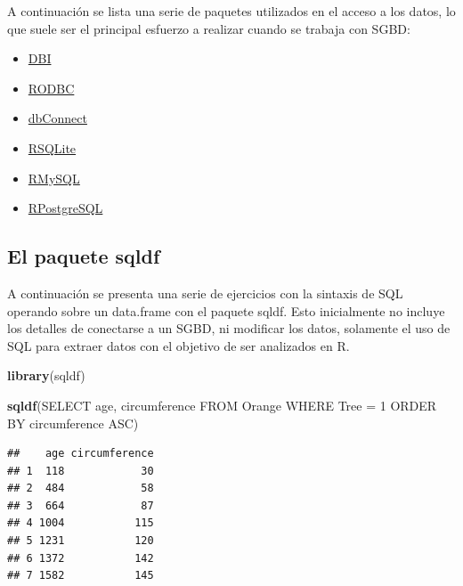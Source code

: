\documentclass[
]{book}
\newenvironment{Shaded}{\begin{snugshade}}{\end{snugshade}}
\newcommand{\FunctionTok}[1]{\textcolor[rgb]{0.13,0.29,0.53}{\textbf{#1}}}
\newcommand{\NormalTok}[1]{#1}
\newcommand{\StringTok}[1]{\textcolor[rgb]{0.31,0.60,0.02}{#1}}
\providecommand{\tightlist}{%
  \setlength{\itemsep}{0pt}\setlength{\parskip}{0pt}}
\theoremstyle{break}
\theoremstyle{nonumberplain}
\begin{document}
A continuación se lista una serie de paquetes utilizados en el acceso a los datos, lo que suele ser el principal esfuerzo a realizar cuando se trabaja con SGBD:

\begin{itemize}
\tightlist
\item
  \href{https://cran.r-project.org/web/packages/DBI/index.html}{DBI}
\item
  \href{https://cran.r-project.org/web/packages/RODBC/index.html}{RODBC}
\item
  \href{https://cran.r-project.org/web/packages/dbConnect/index.html}{dbConnect}
\item
  \href{https://cran.r-project.org/web/packages/RSQLite/index.html}{RSQLite}
\item
  \href{https://cran.r-project.org/web/packages/RMySQL/index.html}{RMySQL}
\item
  \href{https://cran.r-project.org/web/packages/RPostgreSQL/index.html}{RPostgreSQL}
\end{itemize}

\subsection{El paquete sqldf}\label{el-paquete-sqldf}

A continuación se presenta una serie de ejercicios con la sintaxis de SQL operando sobre un data.frame con el paquete sqldf. Esto inicialmente no incluye los detalles de conectarse a un SGBD, ni modificar los
datos, solamente el uso de SQL para extraer datos con el objetivo de ser analizados en R.

\begin{Shaded}
\begin{Highlighting}[]
\FunctionTok{library}\NormalTok{(sqldf)}
\end{Highlighting}
\end{Shaded}

\begin{Shaded}
\begin{Highlighting}[]
\FunctionTok{sqldf}\NormalTok{(}\StringTok{\textquotesingle{}SELECT age, circumference FROM Orange WHERE Tree = 1 ORDER BY circumference ASC\textquotesingle{}}\NormalTok{)}
\end{Highlighting}
\end{Shaded}

\begin{verbatim}
##    age circumference
## 1  118            30
## 2  484            58
## 3  664            87
## 4 1004           115
## 5 1231           120
## 6 1372           142
## 7 1582           145
\end{verbatim}
\end{document}
